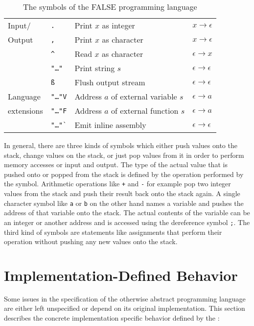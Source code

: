 \begin{table}
\begin{tabular}{@{}llll@{}}
\midrule Input/
& \texttt{.} & Print $x$ as integer & $x \to \epsilon$ \\
Output
& \texttt{,} & Print $x$ as character & $x \to \epsilon$ \\
& \texttt{\^} & Read $x$ as character & $\epsilon \to x$ \\
& \texttt{"\ldots "} & Print string $s$ & $\epsilon \to \epsilon$ \\
& \texttt{\ss} & Flush output stream & $\epsilon \to \epsilon$ \\
\midrule Language
& \texttt{"\ldots "V} & Address $a$ of external variable $s$ & $\epsilon \to a$ \\
extensions
& \texttt{"\ldots "F} & Address $a$ of external function $s$ & $\epsilon \to a$ \\
& \texttt{"\ldots "\`} & Emit inline assembly & $\epsilon \to \epsilon$ \\
\bottomrule
\end{tabular}
\caption{The symbols of the FALSE programming language}
\label{tab:falsymbols}
\end{table}

In general, there are three kinds of symbols which either push values onto the stack, change values on the stack, or just pop values from it in order to perform memory accesses or input and output.
The type of the actual value that is pushed onto or popped from the stack is defined by the operation performed by the symbol.
Arithmetic operations like \texttt{+} and \texttt{-} for example pop two integer values from the stack and push their result back onto the stack again.
A single character symbol like \texttt{a} or \texttt{b} on the other hand names a variable and pushes the address of that variable onto the stack.
The actual contents of the variable can be an integer or another address and is accessed using the dereference symbol \texttt{;}.
The third kind of symbols are statements like assignments that perform their operation without pushing any new values onto the stack.

\section{Implementation-Defined Behavior}\label{sec:falimplementation}

Some issues in the specification of the otherwise abstract programming language are either left unspecified or depend on its original implementation.
This section describes the concrete implementation specific behavior defined by the \ecs{}:

